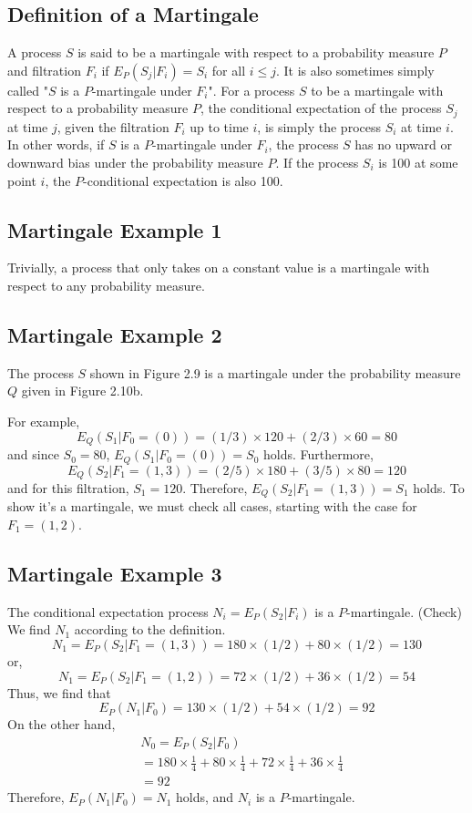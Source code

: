 \documentclass[uplatex,a4j,12pt,dvipdfmx]{jsarticle}
\begin{document}
\subsection{Definition of a Martingale}
A process $S$ is said to be a martingale with respect to a probability measure $P$ and filtration $F_i$ if $E_P( S_j | F_i ) = S_i$ for all $i \le j$. It is also sometimes simply called "$S$ is a $P$-martingale under $F_i$". For a process $S$ to be a martingale with respect to a probability measure $P$, the conditional expectation of the process $S_j$ at time $j$, given the filtration $F_i$ up to time $i$, is simply the process $S_i$ at time $i$. In other words, if $S$ is a $P$-martingale under $F_i$, the process $S$ has no upward or downward bias under the probability measure $P$. If the process $S_i$ is 100 at some point $i$, the $P$-conditional expectation is also 100.

\subsection{Martingale Example 1}
Trivially, a process that only takes on a constant value is a martingale with respect to any probability measure.

\subsection{Martingale Example 2}
The process $S$ shown in Figure 2.9 is a martingale under the probability measure $Q$ given in Figure 2.10b.

For example, \[E_Q( S_1 | F_0 = (0) ) = (1/3) \times 120 + (2/3) \times 60 = 80\] and since $S_{0}=80$, $E_Q( S_1 | F_0 = (0) ) = S_0$ holds. Furthermore, \[E_Q( S_2 | F_1 = (1,3) ) = (2/5) \times 180 + (3/5) \times 80 = 120\] and for this filtration, $S_1 =120$. Therefore, $E_Q( S_2 | F_1 = (1,3) ) = S_1$ holds. To show it's a martingale, we must check all cases, starting with the case for $F_1 = (1,2)$.

\subsection{Martingale Example 3}
The conditional expectation process $N_i = E_P ( S_2 | F_i )$ is a $P$-martingale.
(Check) We find $N_1$ according to the definition.
\[N_1 = E_P ( S_2 | F_1 = (1,3) ) = 180 \times (1/2) + 80 \times (1/2) = 130\]
or,
\[N_1 = E_P ( S_2 | F_1 = (1,2) ) = 72 \times (1/2) + 36 \times (1/2) = 54\]
Thus, we find that
\[E_P( N_1 | F_0 ) = 130 \times (1/2) + 54 \times (1/2) = 92\]
On the other hand,
\begin{align*}
& N_0 = E_P ( S_2 | F_0) \\
&= 180 \times \frac{1}{4} + 80 \times \frac{1}{4} + 72 \times \frac{1}{4} + 36 \times \frac{1}{4} \\
&= 92
\end{align*}
Therefore, $E_P( N_1 | F_0 ) = N_1$ holds, and $N_i$ is a $P$-martingale.
\end{document}
